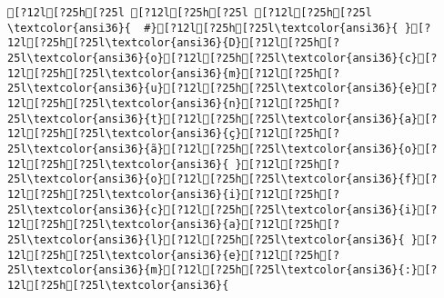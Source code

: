 \documentclass{scrartcl}
\begin{document}
\begin{Verbatim}
[?12l[?25h[?25l [?12l[?25h[?25l [?12l[?25h[?25l
\textcolor{ansi36}{  #}[?12l[?25h[?25l\textcolor{ansi36}{ }[?12l[?25h[?25l\textcolor{ansi36}{D}[?12l[?25h[?25l\textcolor{ansi36}{o}[?12l[?25h[?25l\textcolor{ansi36}{c}[?12l[?25h[?25l\textcolor{ansi36}{m}[?12l[?25h[?25l\textcolor{ansi36}{u}[?12l[?25h[?25l\textcolor{ansi36}{e}[?12l[?25h[?25l\textcolor{ansi36}{n}[?12l[?25h[?25l\textcolor{ansi36}{t}[?12l[?25h[?25l\textcolor{ansi36}{a}[?12l[?25h[?25l\textcolor{ansi36}{ç}[?12l[?25h[?25l\textcolor{ansi36}{ã}[?12l[?25h[?25l\textcolor{ansi36}{o}[?12l[?25h[?25l\textcolor{ansi36}{ }[?12l[?25h[?25l\textcolor{ansi36}{o}[?12l[?25h[?25l\textcolor{ansi36}{f}[?12l[?25h[?25l\textcolor{ansi36}{i}[?12l[?25h[?25l\textcolor{ansi36}{c}[?12l[?25h[?25l\textcolor{ansi36}{i}[?12l[?25h[?25l\textcolor{ansi36}{a}[?12l[?25h[?25l\textcolor{ansi36}{l}[?12l[?25h[?25l\textcolor{ansi36}{ }[?12l[?25h[?25l\textcolor{ansi36}{e}[?12l[?25h[?25l\textcolor{ansi36}{m}[?12l[?25h[?25l\textcolor{ansi36}{:}[?12l[?25h[?25l\textcolor{ansi36}{ 
\end{Verbatim}
\end{document}
